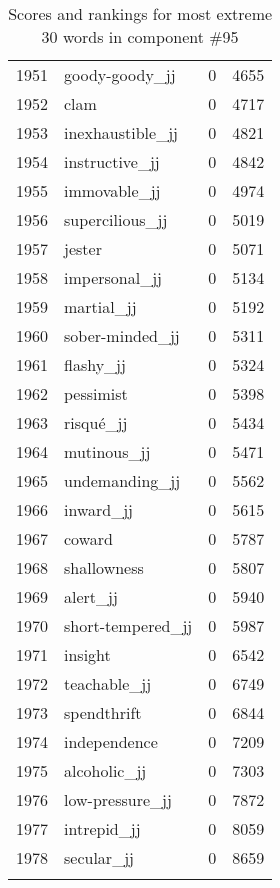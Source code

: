 \begin{longtable}[!htbp]{| rlr@{.}l |}
    1951 & goody-goody\_jj & 0 & 4655 \\
    1952 & clam & 0 & 4717 \\
    1953 & inexhaustible\_jj & 0 & 4821 \\
    1954 & instructive\_jj & 0 & 4842 \\
    1955 & immovable\_jj & 0 & 4974 \\
    1956 & supercilious\_jj & 0 & 5019 \\
    1957 & jester & 0 & 5071 \\
    1958 & impersonal\_jj & 0 & 5134 \\
    1959 & martial\_jj & 0 & 5192 \\
    1960 & sober-minded\_jj & 0 & 5311 \\
    1961 & flashy\_jj & 0 & 5324 \\
    1962 & pessimist & 0 & 5398 \\
    1963 & risqué\_jj & 0 & 5434 \\
    1964 & mutinous\_jj & 0 & 5471 \\
    1965 & undemanding\_jj & 0 & 5562 \\
    1966 & inward\_jj & 0 & 5615 \\
    1967 & coward & 0 & 5787 \\
    1968 & shallowness & 0 & 5807 \\
    1969 & alert\_jj & 0 & 5940 \\
    1970 & short-tempered\_jj & 0 & 5987 \\
    1971 & insight & 0 & 6542 \\
    1972 & teachable\_jj & 0 & 6749 \\
    1973 & spendthrift & 0 & 6844 \\
    1974 & independence & 0 & 7209 \\
    1975 & alcoholic\_jj & 0 & 7303 \\
    1976 & low-pressure\_jj & 0 & 7872 \\
    1977 & intrepid\_jj & 0 & 8059 \\
    1978 & secular\_jj & 0 & 8659 \\
    \hline
    \caption{Scores and rankings for most extreme 30 words in component \#95} \\
\end{longtable}
